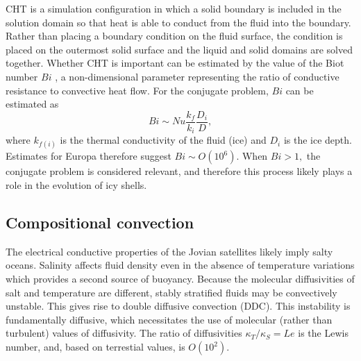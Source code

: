 \documentclass{article}
\def\lb{\left(}
\def\rb{\right)}
\begin{document}

CHT is a simulation configuration in which a solid boundary is included in the solution domain so that heat is able to conduct from the fluid into the boundary. Rather than placing a boundary condition on the fluid surface, the condition is placed on the outermost solid surface and the liquid and solid domains are solved together\citep{dA09}. Whether CHT is important can be estimated by the value of the Biot number $Bi$ \citep{dA09,jL24}, a non-dimensional parameter representing the ratio of conductive resistance to convective heat flow. For the conjugate problem, $Bi$ can be estimated as
\[Bi \sim Nu\frac{k_{f}}{k_{i}}\frac{D_{i}}{D},\]
where $k_{f\lb i\rb }$ is the thermal conductivity of the fluid (ice) and $D_{i}$ is the ice depth.
Estimates for Europa therefore suggest $Bi \sim O\lb 10^{6}\rb$\citep{dL23}. When $Bi>1,$ the conjugate problem is considered relevant, and therefore this process likely plays a role in the evolution of icy shells.
\subsection{Compositional convection}

The electrical conductive properties of the Jovian satellites likely imply salty oceans\citep{cZ00}.
Salinity affects fluid density even in the absence of temperature variations which provides a second source of buoyancy. 
Because the molecular diffusivities of salt and temperature are different, stably stratified fluids may be convectively unstable. 
This gives rise to double diffusive convection (DDC)\citep{sK66,tR13}.
This instability is fundamentally diffusive, which necessitates the use of molecular (rather than turbulent) values of diffusivity.
The ratio of diffusivities $\kappa_T/ \kappa_S=Le$ is the Lewis number, and, based on terrestial values, is $O(10^2)$.
\end{document}
